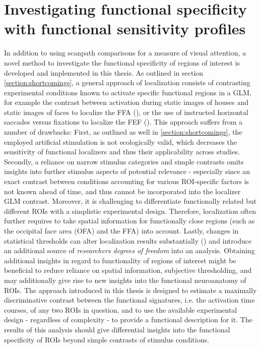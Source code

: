 \documentclass[a4paper, 12pt]{scrreprt}
\begin{document}
\section{Investigating functional specificity with functional sensitivity profiles}\label{section:methodintroduction}

In addition to using scanpath comparisons for a measure of visual attention, a novel method to investigate the functional specificity of regions of interest is developed and implemented in this thesis. As outlined in section \ref{section:shortcomings}, a general approach of localization consists of contrasting experimental conditions known to activate specific functional regions in a GLM, for example the contrast between activation during static images of houses and static images of faces to localize the FFA (\cite{fox2009defining}), or the use of instructed horizontal saccades versus fixations to localize the FEF (\cite{connolly2002human}). This approach suffers from a number of drawbacks: \newline
First, as outlined as well in \ref{section:shortcomings}, the employed artificial stimulation is not ecologically valid, which decreases the sensitivity of functional localizers and thus their applicability across studies. Secondly, a reliance on narrow stimulus categories and simple contrasts omits insights into further stimulus aspects of potential relevance - especially since an exact contrast between conditions accounting for various ROI-specific factors is not known ahead of time, and thus cannot be incorporated into the localizer GLM contrast. Moreover, it is challenging to differentiate functionally related but different ROIs with a simplistic experimental design. Therefore, localization often further requires to take spatial information for functionally close regions (such as the occipital face area (OFA) and the FFA) into account.
Lastly, changes in statistical thresholds can alter localization results substantially (\cite{fox2009defining}) and introduce an additional source of \textit{researchers degrees of freedom} into an analysis. Obtaining additional insights in regard to functionality of regions of interest might be beneficial to reduce reliance on spatial information, subjective thresholding, and may additionally give rise to new insights into the functional neuroanatomy of ROIs.\newline
The approach introduced in this thesis is designed to estimate a maximally discriminative contrast between the functional signatures, i.e. the activation time courses, of any two ROIs in question, and to use the available experimental design - regardless of complexity - to provide a functional description for it. The results of this analysis should give differential insights into the functional specificity of ROIs beyond simple contrasts of stimulus conditions. \newline
\end{document}
